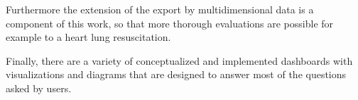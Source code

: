 Furthermore the extension of the export by multidimensional data is a component of this work, so that more thorough evaluations are possible for example to a heart lung resuscitation.

Finally, there are a variety of conceptualized and implemented dashboards with visualizations and diagrams that are designed to answer most of the questions asked by users.

\newpage